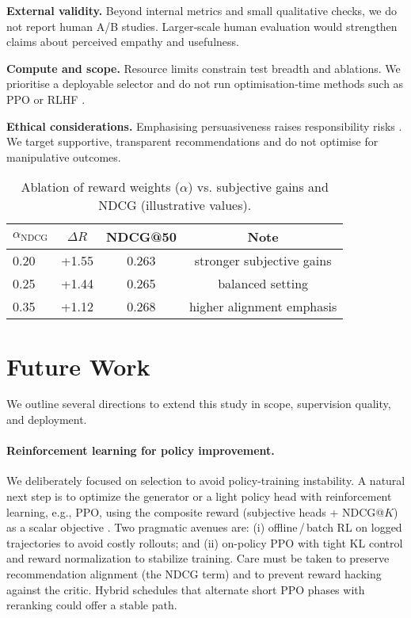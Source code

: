 \documentclass[12pt]{article}
\begin{document}
  \textbf{External validity.} Beyond internal metrics and small qualitative checks, we do not report human A/B studies. Larger‑scale human evaluation would strengthen claims about perceived empathy and usefulness.
  
  \textbf{Compute and scope.} Resource limits constrain test breadth and ablations. We prioritise a deployable selector and do not run optimisation‑time methods such as PPO or RLHF \citep{ppo_wikipedia,rlhf_wikipedia}.
  
  \textbf{Ethical considerations.} Emphasising persuasiveness raises responsibility risks \citep{anthropic_persuasion}. We target supportive, transparent recommendations and do not optimise for manipulative outcomes.
  
  \begin{table}[h]
  \centering
  \begin{tabular}{lccc}
  \toprule
  \(\alpha_{\mathrm{NDCG}}\) & \(\Delta R\) & NDCG@50 & Note \\
  \midrule
  0.20 & +1.55 & 0.263 & stronger subjective gains \\
  0.25 & +1.44 & 0.265 & balanced setting \\
  0.35 & +1.12 & 0.268 & higher alignment emphasis \\
  \bottomrule
  \end{tabular}
  \caption{Ablation of reward weights (\(\alpha\)) vs. subjective gains and NDCG (illustrative values).}
  \label{tab:alpha_ablation}
  \end{table}
  
  \section{Future Work}
  We outline several directions to extend this study in scope, supervision quality, and deployment.
  
  \paragraph{Reinforcement learning for policy improvement.} We deliberately focused on selection to avoid policy-training instability. A natural next step is to optimize the generator or a light policy head with reinforcement learning, e.g., PPO, using the composite reward (subjective heads + NDCG@\(K\)) as a scalar objective \citep{ppo_wikipedia,rlhf_wikipedia}. Two pragmatic avenues are: (i) offline\,/\,batch RL on logged trajectories to avoid costly rollouts; and (ii) on-policy PPO with tight KL control and reward normalization to stabilize training. Care must be taken to preserve recommendation alignment (the NDCG term) and to prevent reward hacking against the critic. Hybrid schedules that alternate short PPO phases with reranking could offer a stable path.
  
\end{document}
